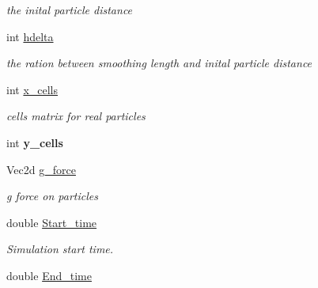 \begin{CompactItemize}
\begin{CompactList}\small\item\em the inital particle distance \item\end{CompactList}\item 
\hypertarget{classInitiation_c0d2d3c34bb4831258ce646b05a35981}{
int \hyperlink{classInitiation_c0d2d3c34bb4831258ce646b05a35981}{hdelta}}
\label{classInitiation_c0d2d3c34bb4831258ce646b05a35981}

\begin{CompactList}\small\item\em the ration between smoothing length and inital particle distance \item\end{CompactList}\item 
\hypertarget{classInitiation_8bc245d0b81987fc9fb8443713ebe6df}{
int \hyperlink{classInitiation_8bc245d0b81987fc9fb8443713ebe6df}{x\_\-cells}}
\label{classInitiation_8bc245d0b81987fc9fb8443713ebe6df}

\begin{CompactList}\small\item\em cells matrix for real particles \item\end{CompactList}\item 
\hypertarget{classInitiation_4741b9c5dfa95aadd6b103f091456f72}{
int \textbf{y\_\-cells}}
\label{classInitiation_4741b9c5dfa95aadd6b103f091456f72}

\item 
\hypertarget{classInitiation_cf2bd144db5215805966ccd40a5abaed}{
Vec2d \hyperlink{classInitiation_cf2bd144db5215805966ccd40a5abaed}{g\_\-force}}
\label{classInitiation_cf2bd144db5215805966ccd40a5abaed}

\begin{CompactList}\small\item\em g force on particles \item\end{CompactList}\item 
\hypertarget{classInitiation_802c22e6b71f5d2cfe68309685bf423b}{
double \hyperlink{classInitiation_802c22e6b71f5d2cfe68309685bf423b}{Start\_\-time}}
\label{classInitiation_802c22e6b71f5d2cfe68309685bf423b}

\begin{CompactList}\small\item\em Simulation start time. \item\end{CompactList}\item 
\hypertarget{classInitiation_0d3e0f13a25c1bbbc7b319ef59838012}{
double \hyperlink{classInitiation_0d3e0f13a25c1bbbc7b319ef59838012}{End\_\-time}}
\label{classInitiation_0d3e0f13a25c1bbbc7b319ef59838012}


\end{CompactItemize}
